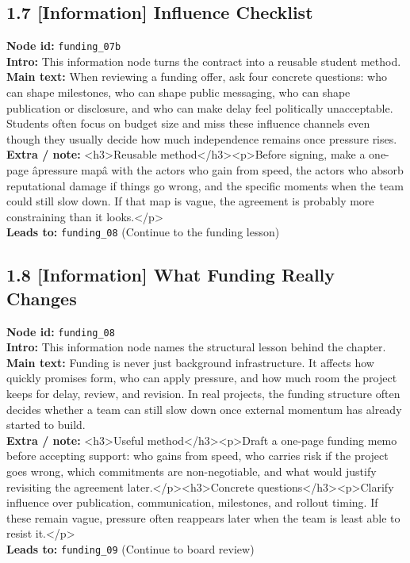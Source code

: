 \documentclass[11pt]{article}
\begin{document}
\subsection*{1.7 [Information] Influence Checklist}
\textbf{Node id:} \texttt{funding\_07b}\\
\textbf{Intro:} This information node turns the contract into a reusable student method.\\
\textbf{Main text:} When reviewing a funding offer, ask four concrete questions: who can shape milestones, who can shape public messaging, who can shape publication or disclosure, and who can make delay feel politically unacceptable. Students often focus on budget size and miss these influence channels even though they usually decide how much independence remains once pressure rises.\\
\textbf{Extra / note:} <h3>Reusable method</h3><p>Before signing, make a one-page âpressure mapâ with the actors who gain from speed, the actors who absorb reputational damage if things go wrong, and the specific moments when the team could still slow down. If that map is vague, the agreement is probably more constraining than it looks.</p>\\
\textbf{Leads to:} \texttt{funding\_08} (Continue to the funding lesson)\\
\subsection*{1.8 [Information] What Funding Really Changes}
\textbf{Node id:} \texttt{funding\_08}\\
\textbf{Intro:} This information node names the structural lesson behind the chapter.\\
\textbf{Main text:} Funding is never just background infrastructure. It affects how quickly promises form, who can apply pressure, and how much room the project keeps for delay, review, and revision. In real projects, the funding structure often decides whether a team can still slow down once external momentum has already started to build.\\
\textbf{Extra / note:} <h3>Useful method</h3><p>Draft a one-page funding memo before accepting support: who gains from speed, who carries risk if the project goes wrong, which commitments are non-negotiable, and what would justify revisiting the agreement later.</p><h3>Concrete questions</h3><p>Clarify influence over publication, communication, milestones, and rollout timing. If these remain vague, pressure often reappears later when the team is least able to resist it.</p>\\
\textbf{Leads to:} \texttt{funding\_09} (Continue to board review)\\
\end{document}

